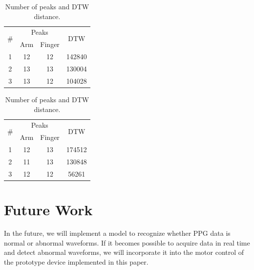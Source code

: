 \documentclass[sigconf]{acmart}
\begin{document}
\begin{table}[!t]
    \centering
    \caption{Number of peaks and DTW distance.}
    \begin{minipage}[t]{0.48\linewidth}
        \centering
        \begin{tabular}{c|cc|c} \hline\hline
            \multirow{2}{*}{\#} & \multicolumn{2}{c|}{Peaks} & \multirow{2}{*}{DTW} \\ \cline{2-3}
             & Arm & Finger & \\ \hline
            1 & 12 & 12 & 142840 \\
            2 & 13 & 13 & 130004 \\
            3 & 13 & 12 & 104028 \\ \hline
        \end{tabular}
        \label{tab:manual}
    \end{minipage}
    \begin{minipage}[t]{0.48\linewidth}
        \centering
        \begin{tabular}{c|cc|c} \hline\hline
            \multirow{2}{*}{\#} & \multicolumn{2}{c|}{Peaks} & \multirow{2}{*}{DTW} \\ \cline{2-3}
             & Arm & Finger & \\ \hline
            1 & 12 & 13 & 174512 \\
            2 & 11 & 13 & 130848 \\
            3 & 12 & 12 & 56261 \\ \hline
        \end{tabular}
        \label{tab:auto}
    \end{minipage}
    \label{tab:result}
\end{table}



\section{Future Work}
\label{sec:future_work}
In the future, we will implement a model to recognize whether PPG data is normal or abnormal waveforms. If it becomes possible to acquire data in real time and detect abnormal waveforms, we will incorporate it into the motor control of the prototype device implemented in this paper.
\end{document}
